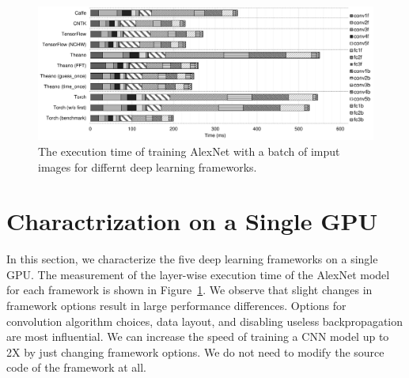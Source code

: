 \begin{figure}[htbp]
  \centering
  \includegraphics[width=\linewidth]{./figures/time_frameworks}
  \caption{%
The execution time of training AlexNet with a batch of imput images for differnt deep learning frameworks. 
\label{fig_time_frameworks}
  }
\end{figure}


\section{Charactrization on a Single GPU}
\label{sec:singlGPU}
In this section, we characterize the five deep learning frameworks on a single GPU. The measurement of the layer-wise execution time of the AlexNet model for each framework is shown in Figure~\ref{fig_time_frameworks}. We observe that slight changes in framework options result in large performance differences. Options for convolution algorithm choices, data layout, and disabling useless backpropagation are most influential. We can increase the speed of training a CNN model up to 2X by just changing framework options. We do not need to modify the source code of the framework at all. 



